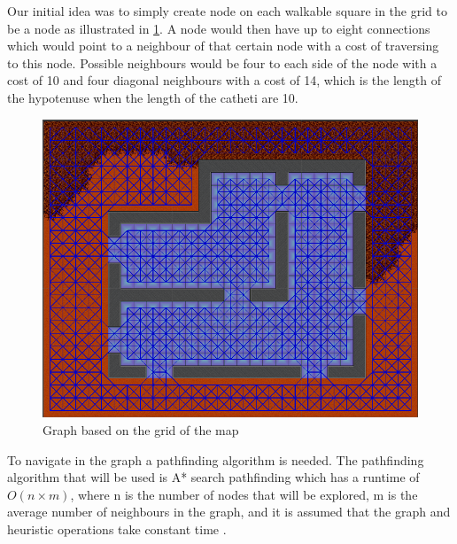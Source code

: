 Our initial idea was to simply create node on each walkable square in the grid to be a node as illustrated in \ref{gridGraph}.
A node would then have up to eight connections which would point to a neighbour of that certain node with a cost of traversing to this node.
Possible neighbours would be four to each side of the node with a cost of 10 and four diagonal neighbours with a cost of 14, which is the length of the hypotenuse when the length of the catheti are 10.
\begin{figure}[H]
	\includegraphics[width=\textwidth]{figures/astar/gridGraph}
	\caption{Graph based on the grid of the map}
	\label{gridGraph}
\end{figure}

To navigate in the graph a pathfinding algorithm is needed. 
The pathfinding algorithm that will be used is A* search pathfinding which has a runtime of $O(n \times m)$, where n is the number of nodes that will be explored, m is the average number of neighbours in the graph, and it is assumed that the graph and heuristic operations take constant time \cite{AIG:Millington}.

